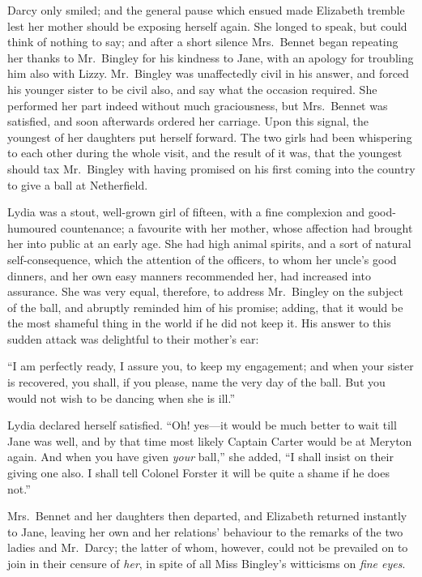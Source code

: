 Darcy only smiled; and the general pause which ensued made
Elizabeth tremble lest her mother should be exposing herself
again.  She longed to speak, but could think of nothing to say;
and after a short silence Mrs.\ Bennet began repeating her thanks
to Mr.\ Bingley for his kindness to Jane, with an apology for
troubling him also with Lizzy.  Mr.\ Bingley was unaffectedly
civil in his answer, and forced his younger sister to be civil
also, and say what the occasion required.  She performed her
part indeed without much graciousness, but Mrs.\ Bennet was
satisfied, and soon afterwards ordered her carriage.  Upon this
signal, the youngest of her daughters put herself forward.  The
two girls had been whispering to each other during the whole
visit, and the result of it was, that the youngest should tax
Mr.\ Bingley with having promised on his first coming into the
country to give a ball at Netherfield.

Lydia was a stout, well-grown girl of fifteen, with a fine
complexion and good-humoured countenance; a favourite with her
mother, whose affection had brought her into public at an early
age.  She had high animal spirits, and a sort of natural
self-consequence, which the attention of the officers, to whom
her uncle's good dinners, and her own easy manners recommended
her, had increased into assurance.  She was very equal,
therefore, to address Mr.\ Bingley on the subject of the ball, and
abruptly reminded him of his promise; adding, that it would be
the most shameful thing in the world if he did not keep it.  His
answer to this sudden attack was delightful to their mother's ear:

``I am perfectly ready, I assure you, to keep my engagement; and
when your sister is recovered, you shall, if you please, name the
very day of the ball.  But you would not wish to be dancing
when she is ill.''

Lydia declared herself satisfied.  ``Oh! yes---it would be much
better to wait till Jane was well, and by that time most likely
Captain Carter would be at Meryton again.  And when you have
given \emph{your} ball,'' she added, ``I shall insist on their giving one
also.  I shall tell Colonel Forster it will be quite a shame if he
does not.''

Mrs.\ Bennet and her daughters then departed, and Elizabeth
returned instantly to Jane, leaving her own and her relations'
behaviour to the remarks of the two ladies and Mr.\ Darcy; the
latter of whom, however, could not be prevailed on to join in
their censure of \emph{her}, in spite of all Miss Bingley's witticisms on
\emph{fine eyes}.



